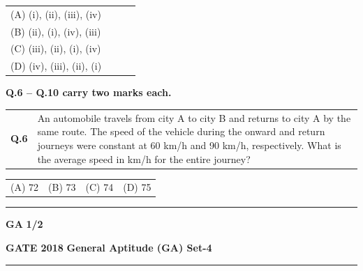 \documentclass{article}
\begin{document}
\hspace{1cm}


\vspace{0.3cm}

\begin{tabular}{llll}
\hspace{1cm} (A) (i), (ii), (iii), (iv) \\
\hspace{1cm} (B) (ii), (i), (iv), (iii) \\
\hspace{1cm} (C) (iii), (ii), (i), (iv) \\
\hspace{1cm} (D) (iv), (iii), (ii), (i) \\
\end{tabular}


\vspace*{1cm} %

 \hspace{0.2cm} \textbf{Q.6 -- Q.10 carry two marks each.}

\vspace{0.6cm}


\noindent
\begin{tabular} 
{@{}ll}
\hspace{0.7cm} \textbf{Q.6} & \parbox[t]{14cm}{
An automobile travels from city A to city B and returns to city A by the same route. The speed of the vehicle during the onward and return journeys were constant at 60 km/h and 90 km/h, respectively. What is the average speed in km/h for the entire journey?
}
\end{tabular}
\vspace{1cm}

\begin{tabular}{llll}

\hspace{1.5cm} (A) 72 &\hspace{2.5cm} (B) 73 & \hspace{2.5cm } (C) 74 &\hspace{2.5cm} (D) 75 \\ 

\end{tabular} 
\vspace{0.5cm}
\hrule 
\vspace{0.2cm}


\textbf{ GA } \hfill \textbf{1/2}

\newpage

\noindent
\textbf{GATE 2018} \hfill \textbf{General Aptitude (GA) Set-4} \\
\rule{\textwidth}{0.4pt}
\end{document}
